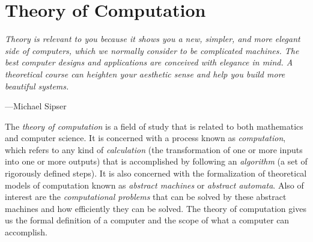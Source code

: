 
\part*{Theory of Computation}

\vspace{\baselineskip}
\begin{displayquote}
	\textit{Theory is relevant to you because it shows you a new, simpler, and more elegant side of computers, which we normally consider to be complicated machines. The best computer designs and applications are conceived with elegance in mind. A theoretical course can heighten your aesthetic sense and help you build more beautiful systems.}
	\begin{flushright}
		---Michael Sipser
	\end{flushright}
\end{displayquote}
\vspace{4mm}


The \textit{theory of computation} is a field of study that is related to both mathematics and computer science. It is concerned with a process known as \textit{computation}, which refers to any kind of \textit{calculation} (the transformation of one or more inputs into one or more outputs) that is accomplished by following an \textit{algorithm} (a set of rigorously defined steps). It is also concerned with the formalization of theoretical models of computation known as \textit{abstract machines} or \textit{abstract automata}. Also of interest are the \textit{computational problems} that can be solved by these abstract machines and how efficiently they can be solved. The theory of computation gives us the formal definition of a computer and the scope of what a computer can accomplish. \\

